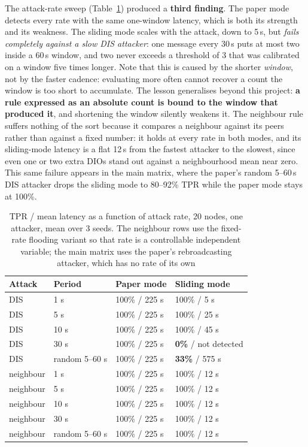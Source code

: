 \documentclass[11pt, a4paper]{article}
\begin{document}
The attack-rate sweep (Table~\ref{tab:rates}) produced a \textbf{third finding}. The paper mode detects every rate with the same one-window latency, which is both its strength and its weakness. The sliding mode scales with the attack, down to 5\,s, but \textit{fails completely against a slow DIS attacker}: one message every 30\,s puts at most two inside a 60\,s window, and two never exceeds a threshold of 3 that was calibrated on a window five times longer. Note that this is caused by the shorter \textit{window}, not by the faster cadence: evaluating more often cannot recover a count the window is too short to accumulate. The lesson generalises beyond this project: \textbf{a rule expressed as an absolute count is bound to the window that produced it}, and shortening the window silently weakens it. The neighbour rule suffers nothing of the sort because it compares a neighbour against its peers rather than against a fixed number: it holds at every rate in both modes, and its sliding-mode latency is a flat 12\,s from the fastest attacker to the slowest, since even one or two extra DIOs stand out against a neighbourhood mean near zero. This same failure appears in the main matrix, where the paper's random 5--60\,s DIS attacker drops the sliding mode to 80--92\% TPR while the paper mode stays at 100\%.

\begin{table}[H]
  \centering \small
  \begin{tabularx}{0.8\textwidth}{lXXX}
    \toprule
    \textbf{Attack} & \textbf{Period} & \textbf{Paper mode} & \textbf{Sliding mode} \\
    \midrule
    DIS       & 1 s            & 100\% / 225 s & 100\% / 5 s \\
    DIS       & 5 s            & 100\% / 225 s & 100\% / 25 s \\
    DIS       & 10 s           & 100\% / 225 s & 100\% / 45 s \\
    DIS       & 30 s           & 100\% / 225 s & \textbf{0\%} / not detected \\
    DIS       & random 5--60 s & 100\% / 225 s & \textbf{33\%} / 575 s \\
    \midrule
    neighbour & 1 s            & 100\% / 225 s & 100\% / 12 s \\
    neighbour & 5 s            & 100\% / 225 s & 100\% / 12 s \\
    neighbour & 10 s           & 100\% / 225 s & 100\% / 12 s \\
    neighbour & 30 s           & 100\% / 225 s & 100\% / 12 s \\
    neighbour & random 5--60 s & 100\% / 225 s & 100\% / 12 s \\
    \bottomrule
  \end{tabularx}
  \caption{TPR / mean latency as a function of attack rate, 20 nodes, one attacker, mean over 3 seeds. The neighbour rows use the fixed-rate flooding variant so that rate is a controllable independent variable; the main matrix uses the paper's rebroadcasting attacker, which has no rate of its own}
  \label{tab:rates}
\end{table}
\end{document}

